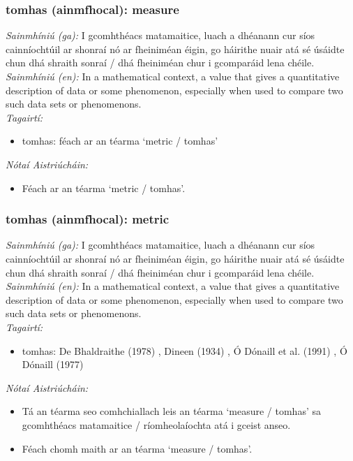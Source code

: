 \subsubsection*{tomhas (ainmfhocal): measure}
 \noindent \textit{Sainmhíniú (ga):} I gcomhthéacs matamaitice, luach a dhéanann cur síos cainníochtúil ar shonraí nó ar fheiniméan éigin, go háirithe nuair atá sé úsáidte chun dhá shraith sonraí / dhá fheiniméan chur i gcomparáid lena chéile.
\\
 \noindent \textit{Sainmhíniú (en):} In a mathematical context, a value that gives a quantitative description of data or some phenomenon, especially when used to compare two such data sets or phenomenons.
\\
 \noindent \textit{Tagairtí:}
\begin{itemize}
	\item tomhas: féach ar an téarma `metric / tomhas'
\end{itemize}

 \noindent \textit{Nótaí Aistriúcháin:}
\begin{itemize}
	\item Féach ar an téarma `metric / tomhas'.
\end{itemize}


\subsubsection*{tomhas (ainmfhocal): metric}
 \noindent \textit{Sainmhíniú (ga):} I gcomhthéacs matamaitice, luach a dhéanann cur síos cainníochtúil ar shonraí nó ar fheiniméan éigin, go háirithe nuair atá sé úsáidte chun dhá shraith sonraí / dhá fheiniméan chur i gcomparáid lena chéile.
\\
 \noindent \textit{Sainmhíniú (en):} In a mathematical context, a value that gives a quantitative description of data or some phenomenon, especially when used to compare two such data sets or phenomenons.
\\
 \noindent \textit{Tagairtí:}
\begin{itemize}
	\item tomhas: De Bhaldraithe (1978) \cite{de-bhaldraithe}, Dineen (1934) \cite{dineen}, Ó Dónaill et al. (1991) \cite{focloir-beag}, Ó Dónaill (1977) \cite{odonaill}
\end{itemize}

 \noindent \textit{Nótaí Aistriúcháin:}
\begin{itemize}
	\item Tá an téarma seo comhchiallach leis an téarma `measure / tomhas' sa gcomhthéacs matamaitice / ríomheolaíochta atá i gceist anseo.
	\item Féach chomh maith ar an téarma `measure / tomhas'.
\end{itemize}



